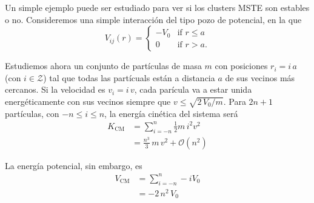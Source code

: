 Un simple ejemplo puede ser estudiado para ver si los clusters MSTE son estables o no.
Consideremos una simple interacción del tipo pozo de potencial, en la que
\begin{equation}
V_{ij}(r) =
\begin{cases}
-V_0 &\text{if } r \leq a\\[2ex]
0 &\text{if } r > a.
\end{cases}
\end{equation}

Estudiemos ahora un conjunto de partículas de masa $m$ con posiciones $r_i = i\,a$ (con $i \in \mathcal{Z}$) tal que todas las partícuals están a distancia $a$ de sus vecinos más cercanos.
Si la velocidad es $v_i = i\,v$, cada parícula va a estar unida energéticamente con sus vecinos siempre que $v \leq \sqrt{2\,V_0/m}$.
Para $2n+1$ partículas, con $-n \leq i \leq n$, la energía cinética del sistema será
\begin{align}
  K_{\text{CM}} &= \sum_{i=-n}^n \frac{1}{2} m\, i^2 v^2\\
  &= \frac{n^3}{3}\,m\,v^2 + \mathcal{O}(n^2)
\end{align}

La energía potencial, sin embargo, es
\begin{align}
  V_{\text{CM}} &= \sum_{i=-n}^n -i V_0\\
  &= - 2\,n^2\,V_0
\end{align}
